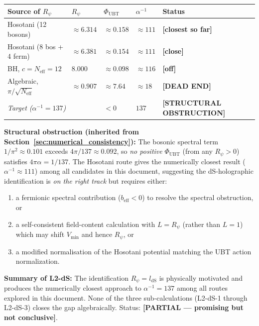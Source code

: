 \documentclass[11pt,a4paper]{article}
\theoremstyle{definition}
\theoremstyle{remark}
\begin{document}
\begin{center}
\begin{tabular}{lllll}
  \toprule
  Source of $R_\psi$ & $R_\psi$ & $\Phi_{\mathrm{UBT}}$
    & $\alpha^{-1}$ & Status \\
  \midrule
  Hosotani (12 bosons)
    & $\approx 6.314$
    & $\approx 0.158$
    & $\approx 111$
    & \textbf{[closest so far]} \\
  Hosotani (8 bos + 4 ferm)
    & $\approx 6.381$
    & $\approx 0.154$
    & $\approx 111$
    & \textbf{[close]} \\
  BH, $c = N_{\mathrm{eff}} = 12$
    & $8.000$
    & $\approx 0.098$
    & $\approx 116$
    & \textbf{[off]} \\
  Algebraic, $\pi/\sqrt{N_{\mathrm{eff}}}$
    & $\approx 0.907$
    & $\approx 7.64$
    & $\approx 18$
    & \textbf{[DEAD END]} \\
  \midrule
  \multicolumn{2}{l}{\emph{Target ($\alpha^{-1}=137$)}}
    & $< 0$ & $137$ & \textbf{[STRUCTURAL OBSTRUCTION]} \\
  \bottomrule
\end{tabular}
\end{center}

\textbf{Structural obstruction (inherited from Section~\ref{sec:numerical_consistency}):}
The bosonic spectral term $1/\pi^2 \approx 0.101$ exceeds
$4\pi/137 \approx 0.092$, so \emph{no positive} $\Phi_{\mathrm{UBT}}$
(from any $R_\psi > 0$) satisfies $4\pi\alpha = 1/137$.
The Hosotani route gives the numerically closest result
($\alpha^{-1} \approx 111$) among all candidates in this document,
suggesting the dS-holographic identification is \emph{on the right track}
but requires either:
\begin{enumerate}
  \item a fermionic spectral contribution ($b_{\mathrm{eff}} < 0$) to
        resolve the spectral obstruction, or
  \item a self-consistent field-content calculation with $L = R_\psi$
        (rather than $L=1$) which may shift $V_{\min}$ and hence $R_\psi$, or
  \item a modified normalisation of the Hosotani potential matching the
        UBT action normalization.
\end{enumerate}

\textbf{Summary of L2-dS:}
The identification $R_\psi = l_{\mathrm{dS}}$ is physically motivated and
produces the numerically closest approach to $\alpha^{-1} = 137$ among all
routes explored in this document.
None of the three sub-calculations (L2-dS-1 through L2-dS-3) closes the gap
algebraically.
Status: \textbf{[PARTIAL --- promising but not conclusive]}.
\end{document}
